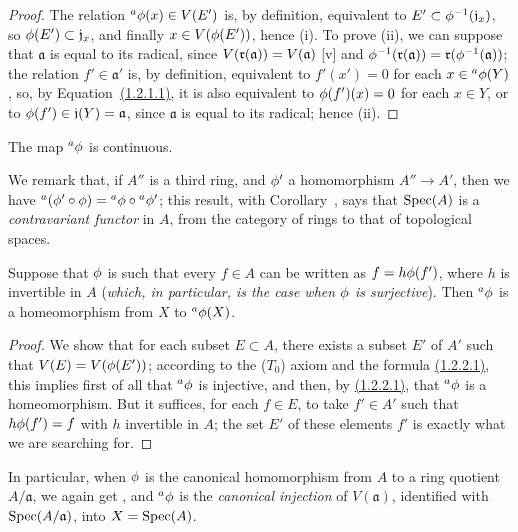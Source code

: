 \begin{proof}
\label{proof-I.1.2.2}
The relation ${}^a\phi(x)\in V(E')$ is, by definition, equivalent to $E'\subset\phi^{-1}(\mathfrak{j}_x)$, so $\phi(E')\subset\mathfrak{j}_x$, and finally $x\in V(\phi(E'))$, hence (i).
To prove (ii), we can suppose that $\mathfrak{a}$ is equal to its radical, since $V(\mathfrak{r}(\mathfrak{a}))=V(\mathfrak{a})$ [v] and $\phi^{-1}(\mathfrak{r}(\mathfrak{a}))=\mathfrak{r}(\phi^{-1}(\mathfrak{a}))$;
the relation $f'\in\mathfrak{a}'$ is, by definition, equivalent to $f'(x')=0$ for each $x\in{{}^a\phi(Y)}$, so, by Equation~\hyperref[1.1.2.1]{(1.2.1.1)}, it is also equivalent to $\phi(f')(x)=0$ for each $x\in Y$, or to $\phi(f')\in\mathfrak{j}(Y)=\mathfrak{a}$, since $\mathfrak{a}$ is equal to its radical;
hence (ii).
\end{proof}

\begin{corollary}[1.2.3]
\label{I.1.2.3}
The map ${}^a\phi$ is continuous.
\end{corollary}

We remark that, if $A''$ is a third ring, and $\phi'$ a homomorphism $A''\to A'$, then we have ${}^a(\phi'\circ\phi)={}^a\phi\circ{}^a\phi'$;
this result, with Corollary~, says that $\operatorname{Spec}(A)$ is a \emph{contravariant functor} in $A$, from the category of rings to that of topological spaces.

\begin{corollary}[1.2.4]
\label{I.1.2.4}
Suppose that $\phi$ is such that every $f\in A$ can be written as $f=h\phi(f')$, where $h$ is invertible in $A$ (\emph{which, in particular, is the case when $\phi$ is \emph{surjective}}).
Then ${}^a\phi$ is a homeomorphism from $X$ to ${}^a\phi(X)$.
\end{corollary}

\begin{proof}
\label{proof-I.1.2.4}
We show that for each subset $E\subset A$, there exists a subset $E'$ of $A'$ such that $V(E)=V(\phi(E'))$;
according to the ($T_0$) axiom  and the formula \hyperref[1.1.2.2]{(1.2.2.1)}, this implies first of all that ${}^a\phi$ is injective, and then, by \hyperref[1.1.2.2]{(1.2.2.1)}, that ${}^a\phi$ is a homeomorphism.
But it suffices, for each $f\in E$, to take $f'\in A'$ such that $h\phi(f')=f$ with $h$ invertible in $A$;
the set $E'$ of these elements $f'$ is exactly what we are searching for.
\end{proof}

\begin{env}[1.2.5]
\label{I.1.2.5}
In particular, when $\phi$ is the canonical homomorphism from $A$ to a ring quotient $A/\mathfrak{a}$, we again get , and ${}^a\phi$ is the \emph{canonical injection} of $V(\mathfrak{a})$, identified with $\operatorname{Spec}(A/\mathfrak{a})$, into $X=\operatorname{Spec}(A)$.
\end{env}

